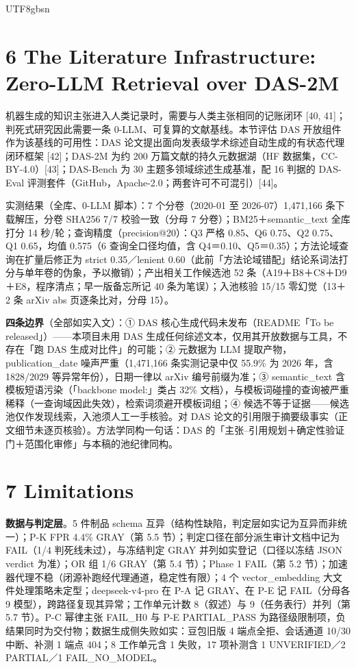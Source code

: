 \documentclass[10pt,a4paper]{article}
\begin{document}
\begin{CJK}{UTF8}{gbsn}
\section*{6 The Literature Infrastructure: Zero-LLM Retrieval over DAS-2M}机器生成的知识主张进入人类记录时，需要与人类主张相同的记账闭环 [40, 41]；判死式研究因此需要一条 0-LLM、可复算的文献基线。本节评估 DAS 开放组件作为该基线的可用性：DAS 论文提出面向发表级学术综述自动生成的有状态代理闭环框架 [42]；DAS-2M 为约 200 万篇文献的持久元数据湖（HF 数据集，CC-BY-4.0）[43]；DAS-Bench 为 30 主题多领域综述生成基准，配 16 判据的 DAS-Eval 评测套件（GitHub，Apache-2.0；两套许可不可混引）[44]。

实测结果（全库、0-LLM 脚本）：7 个分卷（2020-01 至 2026-07）1,471,166 条下载解压，分卷 SHA256 7/7 校验一致（分母 7 分卷）；BM25＋semantic\_text 全库打分 14 秒/轮；查询精度（precision@20）：Q3 严格 0.85、Q6 0.75、Q2 0.75、Q1 0.65，均值 0.575（6 查询全口径均值，含 Q4＝0.10、Q5＝0.35）；方法论域查询在扩量后修正为 strict 0.35／lenient 0.60（此前「方法论域错配」结论系词法打分与单年卷的伪象，予以撤销）；产出相关工作候选池 52 条（A19＋B8＋C8＋D9＋E8，程序清点；早一版备忘所记 40 条为笔误）；入池核验 15/15 零幻觉（13＋2 条 arXiv abs 页逐条比对，分母 15）。

\textbf{四条边界}（全部如实入文）：① DAS 核心生成代码未发布（README「To be released」）——本项目未用 DAS 生成任何综述文本，仅用其开放数据与工具，不存在「跑 DAS 生成对比件」的可能；② 元数据为 LLM 提取产物，publication\_date 噪声严重（1,471,166 条实测记录中仅 55.9\% 为 2026 年，含 1828/2029 等异常年份），日期一律以 arXiv 编号前缀为准；③ semantic\_text 含模板短语污染（「backbone model:」类占 32\% 文档），与模板词碰撞的查询被严重稀释（一查询域因此失效），检索词须避开模板词组；④ 候选不等于证据——候选池仅作发现线索，入池须人工一手核验。对 DAS 论文的引用限于摘要级事实（正文细节未逐页核验）。方法学同构一句话：DAS 的「主张–引用规划＋确定性验证门＋范围化审修」与本稿的池纪律同构。


\section*{7 Limitations}\textbf{数据与判定层}。5 件制品 schema 互异（结构性缺陷，判定层如实记为互异而非统一）；P-K FPR 4.4\% GRAY（第 5.5 节）；判定口径在部分派生审计文档中记为 FAIL（1/4 判死线未过），与冻结判定 GRAY 并列如实登记（口径以冻结 JSON verdict 为准）；OR 组 1/6 GRAY（第 5.4 节）；Phase 1 FAIL（第 5.2 节）；加速器代理不稳（闭源补跑经代理通道，稳定性有限）；4 个 vector\_embedding 大文件处理策略未定型；deepseek-v4-pro 在 P-A 记 GRAY、在 P-E 记 FAIL（分母各 9 模型），跨路径复现其异常；工作单元计数 8（叙述）与 9（任务表行）并列（第 5.7 节）。P-C 幂律主张 FAIL\_H0 与 P-E PARTIAL\_PASS 为路径级限制项，负结果同时为交付物；数据生成侧失败如实：豆包旧版 4 端点全拒、会话通道 10/30 中断、补测 1 端点 404；8 工作单元含 1 失败，17 项补测含 1 UNVERIFIED／2 PARTIAL／1 FAIL\_NO\_MODEL。


\end{CJK}
\end{document}
